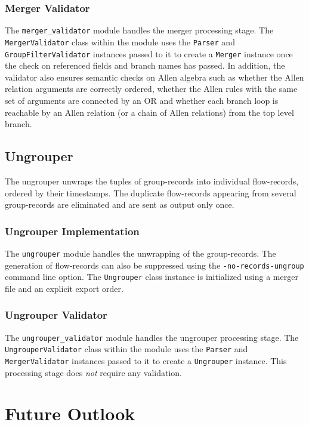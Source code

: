 \subsubsection{Merger Validator}\label{subsubsec:merger-validator}
The \texttt{merger\_validator} module handles the merger processing stage.
The \texttt{MergerValidator} class within the module uses the \texttt{Parser} and \texttt{GroupFilterValidator} instances passed to it to create a \texttt{Merger} instance once the check on referenced fields and branch names has passed. In addition, the validator also ensures semantic checks on Allen algebra such as whether the Allen relation arguments are correctly ordered, whether the Allen rules with the same set of arguments are connected by an OR and whether each branch loop is reachable by an Allen relation (or a chain of Allen relations) from the top level branch.

\subsection{Ungrouper}\label{subsec:ungrouper}
The ungrouper unwraps the tuples of group-records into individual flow-records, ordered by their timestamps. The duplicate flow-records appearing from several group-records are eliminated and are sent as output only once. 

\subsubsection{Ungrouper Implementation}\label{subsubsec:ungrouper-impl}
The \texttt{ungrouper} module handles the unwrapping of the group-records. The generation of flow-records can also be suppressed using the \texttt{-no-records-ungroup} command line option. The \texttt{Ungrouper} class instance is initialized using a merger file and an explicit export order.

\subsubsection{Ungrouper Validator}\label{subsubsec:ungrouper-validator}
The \texttt{ungrouper\_validator} module handles the ungrouper processing stage.
The \texttt{UngrouperValidator} class within the module uses the \texttt{Parser} and \texttt{MergerValidator} instances passed to it to create a \texttt{Ungrouper} instance. This processing stage does \emph{not} require any validation.

\section{Future Outlook}\label{sec:flowy-future}
